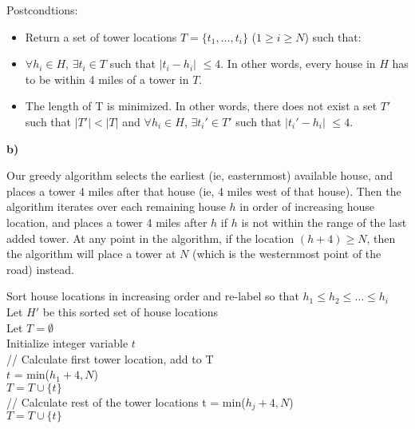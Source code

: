 \documentclass{article}
\begin{document}
Postcondtions:
\begin{itemize}
    \item Return a set of tower locations $T = \{t_1, \dotsc, t_i\}$ ($1 \geq i \geq N$) such that:
    \item $\forall h_i \in H$, $\exists t_i \in T$ such that $|t_i-h_i|$ $\leq 4$. In other words, every house in $H$ has to be within 4 miles of a tower in $T$.
    \item The length of T is minimized. In other words, there does not exist a set $T'$ such that $|T'| < |T|$ and $\forall h_i \in H$, $\exists t_i' \in T'$ such that $|t_i'-h_i|$ $\leq 4$.
\end{itemize}

\textbf{b)}

Our greedy algorithm selects the earliest (ie, easternmost) available house, and places a tower 4 miles after that house (ie, 4 miles west of that house). Then the algorithm iterates over each remaining house $h$ in order of increasing house location, and places a tower 4 miles after $h$ if $h$ is not within the range of the last added tower. At any point in the algorithm, if the location $(h+4) \ge N$, then the algorithm will place a tower at $N$ (which is the westernmost point of the road) instead.

\begin{algorithm}[H]
\DontPrintSemicolon
\SetAlgoLined
{} %

 {
\;
    Sort house locations in increasing order and re-label so that $h_1 \leq h_2 \leq \dotsc \leq h_i$\\
    Let $H'$ be this sorted set of house locations\\
    Let $T = \emptyset$\\
    Initialize integer variable $t$\\
\;    
    // Calculate first tower location, add to T\\
    $t$ = min(${h_1+4}, N$)\\
    $T = T \cup \{t\}$\\
\;  
    // Calculate rest of the tower locations\;
     {
         {
            t = min(${h_j+4}, N$)\\
            $T = T \cup \{t\}$\\
        }
    }  
    \;
}
\end{algorithm}
\end{document}
